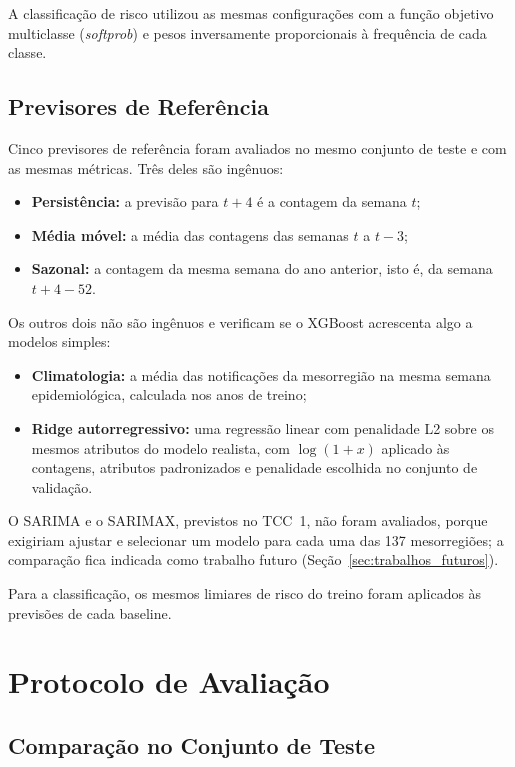 A classificação de risco utilizou as mesmas configurações com a função objetivo multiclasse (\textit{softprob}) e pesos inversamente proporcionais à frequência de cada classe.

\subsection{Previsores de Referência}
\label{sec:met_referencias}

Cinco previsores de referência foram avaliados no mesmo conjunto de teste e com as mesmas métricas. Três deles são ingênuos:

\begin{itemize}
    \item \textbf{Persistência:} a previsão para $t+4$ é a contagem da semana $t$;
    \item \textbf{Média móvel:} a média das contagens das semanas $t$ a $t-3$;
    \item \textbf{Sazonal:} a contagem da mesma semana do ano anterior, isto é, da semana $t+4-52$.
\end{itemize}

Os outros dois não são ingênuos e verificam se o XGBoost acrescenta algo a modelos simples:

\begin{itemize}
    \item \textbf{Climatologia:} a média das notificações da mesorregião na mesma semana epidemiológica, calculada nos anos de treino;
    \item \textbf{Ridge autorregressivo:} uma regressão linear com penalidade L2 sobre os mesmos atributos do modelo realista, com $\log(1+x)$ aplicado às contagens, atributos padronizados e penalidade escolhida no conjunto de validação.
\end{itemize}

O SARIMA e o SARIMAX, previstos no TCC~1, não foram avaliados, porque exigiriam ajustar e selecionar um modelo para cada uma das 137 mesorregiões; a comparação fica indicada como trabalho futuro (Seção~\ref{sec:trabalhos_futuros}).

Para a classificação, os mesmos limiares de risco do treino foram aplicados às previsões de cada baseline.

\section{Protocolo de Avaliação}

\subsection{Comparação no Conjunto de Teste}

